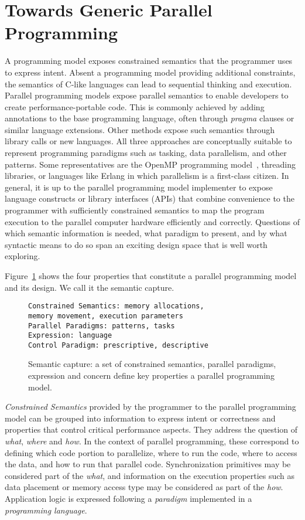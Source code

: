 \section{Towards Generic Parallel Programming}\label{chap:background}

A programming model exposes constrained semantics that the programmer uses to express intent. Absent a programming model providing additional constraints, the semantics of C-like languages can lead to sequential thinking and execution. Parallel programming models expose parallel semantics to enable developers to create performance-portable code. This is commonly achieved by adding annotations to the base programming language, often through \emph{pragma} clauses or similar language extensions. Other methods expose such semantics through library calls or new languages. All three approaches are conceptually suitable to represent programming paradigms such as tasking, data parallelism, and other patterns. Some representatives are the OpenMP programming model~\cite{OPENMP}, threading libraries, or languages like Erlang\cite{ERLANG} in which parallelism is a first-class citizen. In general, it is up to the parallel programming model implementer to expose language constructs or library interfaces (APIs) that combine convenience to the programmer with sufficiently constrained semantics to map the program execution to the parallel computer hardware efficiently and correctly. Questions of which semantic information is needed, what paradigm to present, and by what syntactic means to do so span an exciting design space that is well worth exploring.

 Figure~\ref{figSemCapture} shows the four properties that constitute a parallel programming model and its design. We call it the semantic capture.

\begin{figure}[h]
\begin{Verbatim}[frame=leftline]
Constrained Semantics: memory allocations, 
memory movement, execution parameters
Parallel Paradigms: patterns, tasks
Expression: language 
Control Paradigm: prescriptive, descriptive
\end{Verbatim}
\caption{Semantic capture: a set of constrained semantics, parallel paradigms, expression and concern define key properties a parallel programming model.}
\label{figSemCapture}
\end{figure}

\emph{Constrained Semantics} provided by the programmer to the parallel programming model can be grouped into information to express intent or correctness and properties that control critical performance aspects. They address the question of \emph{what}, \emph{where} and \emph{how}. In the context of parallel programming, these correspond to defining which code portion to parallelize, where to run the code, where to access the data, and how to run that parallel code. Synchronization primitives may be considered part of the \emph{what}, and information on the execution properties such as data placement or memory access type may be considered as part of the \emph{how}. Application logic is expressed following a \emph{paradigm} implemented in a \emph{programming language}.

